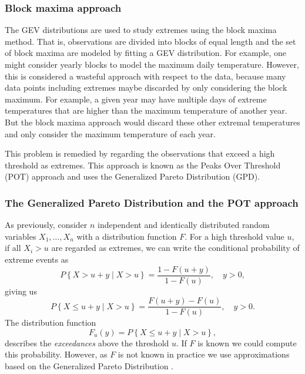 \documentclass[11pt,a4paper,]{article}
\theoremstyle{definition}
\theoremstyle{definition}
\theoremstyle{definition}
\theoremstyle{remark}
\begin{document}
\hypertarget{block-maxima-approach}{%
\subsubsection*{Block maxima approach}\label{block-maxima-approach}}

The GEV distributions are used to study extremes using the block maxima method. That is, observations are divided into blocks of equal length and the set of block maxima are modeled by fitting a GEV distribution. For example, one might consider yearly blocks to model the maximum daily temperature. However, this is considered a wasteful approach with respect to the data, because many data points including extremes maybe discarded by only considering the block maximum. For example, a given year may have multiple days of extreme temperatures that are higher than the maximum temperature of another year. But the block maxima approach would discard these other extremal temperatures and only consider the maximum temperature of each year.

This problem is remedied by regarding the observations that exceed a high threshold as extremes. This approach is known as the Peaks Over Threshold (POT) approach and uses the Generalized Pareto Distribution (GPD).

\hypertarget{the-generalized-pareto-distribution-and-the-pot-approach}{%
\subsubsection*{The Generalized Pareto Distribution and the POT approach}\label{the-generalized-pareto-distribution-and-the-pot-approach}}

As previously, consider \(n\) independent and identically distributed random variables \(X_1, \dots, X_n\) with a distribution function \(F\). For a high threshold value \(u\), if all \(X_i > u\) are regarded as extremes, we can write the conditional probability of extreme events as
\begin{equation}\label{eq:POT1}
    P\left \{X > u + y \mid X > u \right \} = \frac{1 - F(u+y)}{1 - F(u)} , \quad y >0  ,
\end{equation}
giving us
\begin{equation}\label{eq:POT2}
    P\left \{X \leq u + y \mid X > u \right \} = \frac{ F(u+y) - F(u)}{1 - F(u)} , \quad y >0  .
\end{equation}
The distribution function
\begin{equation}\label{eq:POT3}
    F_u(y) = P\left \{X \leq u + y \mid X > u \right \} ,
\end{equation}
describes the \emph{exceedances} above the threshold \(u\). If \(F\) is known we could compute this probability. However, as \(F\) is not known in practice we use approximations based on the Generalized Pareto Distribution \autocite{Pickands1975}.
\end{document}
